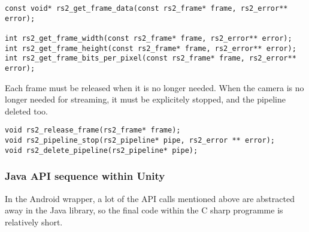     \begin{lstlisting}[style=CStyle]
const void* rs2_get_frame_data(const rs2_frame* frame, rs2_error** error);

int rs2_get_frame_width(const rs2_frame* frame, rs2_error** error);
int rs2_get_frame_height(const rs2_frame* frame, rs2_error** error);
int rs2_get_frame_bits_per_pixel(const rs2_frame* frame, rs2_error** error);\end{lstlisting}

    Each frame must be released when it is no longer needed. When the camera is no longer needed for streaming, it must be explicitely stopped, and the pipeline deleted too.
    \begin{lstlisting}[style=CStyle]
void rs2_release_frame(rs2_frame* frame);
void rs2_pipeline_stop(rs2_pipeline* pipe, rs2_error ** error);
void rs2_delete_pipeline(rs2_pipeline* pipe);\end{lstlisting}


    \subsubsection{Java API sequence within Unity}
    In the Android wrapper, a lot of the API calls mentioned above are abstracted away in the Java library, so the final code within the C sharp programme is relatively short.

